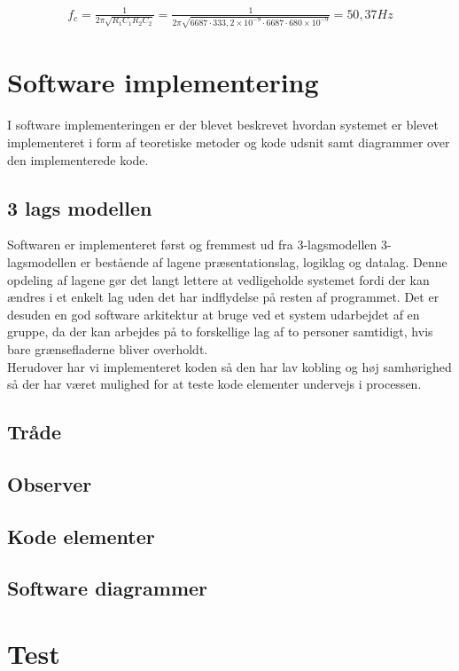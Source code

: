 \begin{align}
f_{c} = \frac{1}{2\pi \sqrt{R_{1}C_{1}R_{2}C_{2}}} = \frac{1}{2\pi \sqrt{6687 \cdot 333,2\times 10^{-9} \cdot 6687 \cdot 680\times 10^{-9}}} = 50,37 Hz
	\label{cutoff}
\end{align}

\section{Software implementering}
I software implementeringen er der blevet beskrevet hvordan systemet er blevet implementeret i form af teoretiske metoder og kode udsnit samt diagrammer over den implementerede kode.
\subsection{3 lags modellen}
Softwaren er implementeret først og fremmest ud fra 3-lagsmodellen 3-lagsmodellen er
bestående af lagene præsentationslag, logiklag og datalag. Denne opdeling af lagene gør
det langt lettere at vedligeholde systemet fordi der kan ændres i et enkelt lag uden det har
indflydelse på resten af programmet.
Det er desuden en god software arkitektur at bruge ved et system udarbejdet af en gruppe,
da der kan arbejdes på to forskellige lag af to personer samtidigt, hvis bare grænsefladerne
bliver overholdt.\\
Herudover har vi implementeret koden så den har lav kobling og høj samhørighed så der har været mulighed for at teste kode elementer undervejs i processen. 

\subsection{Tråde}

\subsection{Observer}

\subsection{Kode elementer}

\subsection{Software diagrammer}

\section{Test}


